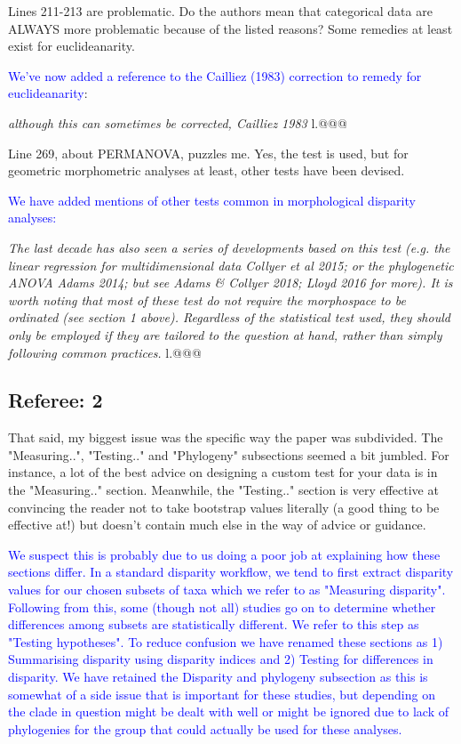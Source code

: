 \documentclass[12pt,letterpaper]{article}
\begin{document}
\noindent Lines 211-213 are problematic. Do the authors mean that categorical data are ALWAYS more problematic because of the listed reasons? Some remedies at least exist for euclideanarity.


\textcolor{blue}{We've now added a reference to the Cailliez (1983) correction to remedy for euclideanarity}:

\textit{although this can sometimes be corrected, Cailliez 1983} l.@@@

\noindent Line 269, about PERMANOVA, puzzles me. Yes, the test is used, but for geometric morphometric analyses at least, other tests have been devised.

\textcolor{blue}{We have added mentions of other tests common in morphological disparity analyses:}

\textit{The last decade has also seen a series of developments based on this test (e.g. the linear regression for multidimensional data Collyer et al 2015; or the phylogenetic ANOVA Adams 2014; but see Adams \& Collyer 2018; Lloyd 2016 for more).
It is worth noting that most of these test do not require the morphospace to be ordinated (see section 1 above).
Regardless of the statistical test used, they should only be employed if they are tailored to the question at hand, rather than simply following common practices.} l.@@@

\subsection{Referee: 2}

\noindent That said, my biggest issue was the specific way the paper was subdivided. The "Measuring..", "Testing.." and "Phylogeny" subsections seemed a bit jumbled. For instance, a lot of the best advice on designing a custom test for your data is in the "Measuring.." section. Meanwhile, the "Testing.." section is very effective at convincing the reader not to take bootstrap values literally (a good thing to be effective at!) but doesn't contain much else in the way of advice or guidance.

\textcolor{blue}{We suspect this is probably due to us doing a poor job at explaining how these sections differ. In a standard disparity workflow, we tend to first extract disparity values for our chosen subsets of taxa which we refer to as "Measuring disparity". Following from this, some (though not all) studies go on to determine whether differences among subsets are statistically different. We refer to this step as "Testing hypotheses". To reduce confusion we have renamed these sections as 1) Summarising disparity using disparity indices and 2) Testing for differences in disparity. We have retained the Disparity and phylogeny subsection as this is somewhat of a side issue that is important for these studies, but depending on the clade in question might be dealt with well or might be ignored due to lack of phylogenies for the group that could actually be used for these analyses.}
\end{document}
